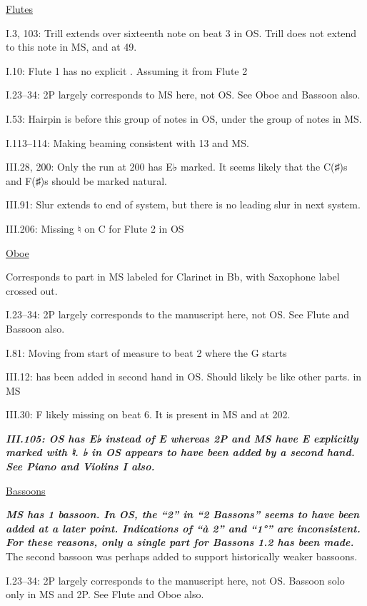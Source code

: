 \documentclass[twoside]{article}
\newcommand\dynmark[1]{\scalebox{0.9}{#1}{\kern1pt}}
\begin{document}
\begin{hangparas}{15pt}{1}
\begin{multicols}{2}
\underline{Flutes}

I.3, 103: Trill extends over sixteenth note on beat 3 in OS. Trill does not extend to this note in MS, and at 49.

I.10: Flute 1 has no explicit \dynmark{\mf}. Assuming it from Flute 2

I.23--34: 2P largely corresponds to MS here, not OS. See Oboe and Bassoon also.

I.53: Hairpin is before this group of notes in OS, under the group of notes in MS.

I.113--114: Making beaming consistent with 13 and MS.

III.28, 200: Only the run at 200 has E♭ marked. It seems likely that the C(♯)s and F(♯)s should be marked natural.

III.91: Slur extends to end of system, but there is no leading slur in next system.

III.206: Missing ♮ on C for Flute 2 in OS

\underline{Oboe}

Corresponds to part in MS labeled for Clarinet in Bb, with Saxophone label crossed out.

I.23--34: 2P largely corresponds to the manuscript here, not OS. See Flute and Bassoon also.

I.81: Moving \dynmark{\mf} from start of measure to beat 2 where the G starts

III.12: \dynmark{\f} has been added in second hand in OS. Should likely be \dynmark{\ff} like other parts. \dynmark{\ff} in MS

III.30: F likely missing on beat 6. It is present in MS and at 202.

\textbf{\textit{III.105: OS has E♭ instead of E whereas 2P and MS have E explicitly marked with ♮. ♭ in OS appears to have been added by a second hand. See Piano and Violins I also.}}

\columnbreak

\underline{Bassoons}

\textbf{\textit{MS has 1 bassoon. In OS, the ``2'' in ``2 Bassons'' seems to have been added at a later point. Indications of ``à 2'' and ``1°'' are inconsistent. For these reasons, only a single part for Bassons 1.2 has been made.}} The second bassoon was perhaps added to support historically weaker bassoons.

I.23--34: 2P largely corresponds to the manuscript here, not OS. Bassoon solo only in MS and 2P. See Flute and Oboe also.


\end{multicols}
\end{hangparas}
\end{document}
